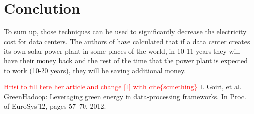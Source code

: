 \documentclass[9pt, a4paper]{article}
\theoremstyle{plain}
\begin{document}

\section{Conclution} %
\label{sec:Conclution}
  To sum up, those techniques can be used to significantly decrease the
  electricity cost for data centers. The authors of \cite{greenhadoop} have
  calculated that if a data center creates its own solar power plant in some
  places of the world, in 10-11 years they will have their money back and the
  rest of the time that the power plant is expected to work (10-20 years), they
  will be saving additional money.

\begin{thebibliography}{widest entry}
   \textcolor{red}{Hrisi to fill here her article and change [1]
    with cite\{something\}}
   I. Goiri, et al. GreenHadoop: Leveraging green energy in
    data-processing frameworks. In Proc. of EuroSys’12, pages 57–70, 2012.
\end{thebibliography}

\hfill\\
\end{document}
